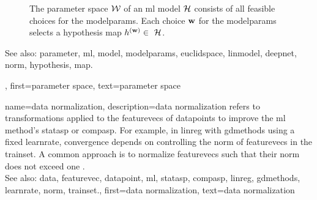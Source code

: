 {{\begin{figure}[H]
\begin{center}
			\end{center} 
			\caption{The \gls{parameter} space $\mathcal{W}$ of an \gls{ml} \gls{model} $\mathcal{H}$ consists of all 
			feasible choices for the \gls{modelparams}. Each choice ${\bf w}$ for the \gls{modelparams} 
			selects a \gls{hypothesis} \gls{map} $\hypothesis^{(\weights)} \in \hypospace$.
				 \label{fig_param_space_dict}} 
			\end{figure}
			See also: \gls{parameter}, \gls{ml}, \gls{model}, \gls{modelparams}, \gls{euclidspace}, \gls{linmodel}, \gls{deepnet}, \gls{norm}, \gls{hypothesis}, \gls{map}.},
		first={parameter space},
		text={parameter space}
}

{name={data normalization},
	description={\Gls{data} normalization refers to transformations 
		applied to the \glspl{featurevec} of \glspl{datapoint} to improve the \gls{ml} method's 
		\gls{statasp} or \gls{compasp}. For example, in \gls{linreg} with \gls{gdmethods} using 
		a fixed \gls{learnrate}, convergence depends on controlling the \gls{norm} of \glspl{featurevec} 
		in the \gls{trainset}. A common approach is to normalize \glspl{featurevec} such that their 
		\gls{norm} does not exceed one \cite[Ch.\ 5]{MLBasics}.
				\\
		See also: \gls{data}, \gls{featurevec}, \gls{datapoint}, \gls{ml}, \gls{statasp}, \gls{compasp}, \gls{linreg}, \gls{gdmethods}, \gls{learnrate}, \gls{norm}, \gls{trainset}.},
	first={data normalization},
	text={data normalization}
}

